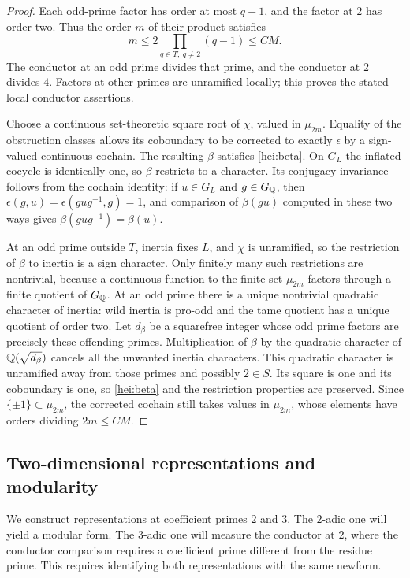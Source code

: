 \begin{proof}
Each odd-prime factor has order at most $q-1$, and the factor at $2$
has order two.  Thus the order $m$ of their product satisfies
\[
              m\le 2\prod_{q\in T,\ q\ne2}(q-1)\le C M.
\]
The conductor at an odd prime divides that prime, and the conductor
at $2$ divides $4$.  Factors at other primes are unramified locally;
this proves the stated local conductor assertions.

Choose a continuous set-theoretic square root of $\chi$, valued in
$\mu_{2m}$.  Equality of the obstruction classes allows its
coboundary to be corrected to exactly $\epsilon$ by a sign-valued
continuous cochain.  The resulting $\beta$ satisfies
\eqref{hei:beta}.  On $G_L$ the inflated cocycle is identically one,
so $\beta$ restricts to a character.  Its conjugacy invariance follows
from the cochain identity: if $u\in G_L$ and $g\in G_\mathbb Q$, then
$\epsilon(g,u)=\epsilon(gug^{-1},g)=1$, and comparison of
$\beta(gu)$ computed in these two ways gives
$\beta(gug^{-1})=\beta(u)$.

At an odd prime outside $T$, inertia fixes $L$, and $\chi$ is
unramified, so the restriction of $\beta$ to inertia is a sign
character.  Only finitely many such restrictions are nontrivial,
because a continuous function to the finite set $\mu_{2m}$ factors
through a finite quotient of $G_\mathbb Q$.  At an odd prime there is a
unique nontrivial quadratic character of inertia: wild inertia is
pro-odd and the tame quotient has a unique quotient of order two.
Let $d_\beta$ be a squarefree integer whose odd prime factors are
precisely these offending primes.  Multiplication of $\beta$ by the
quadratic character of $\mathbb Q(\sqrt{d_\beta})$ cancels all the unwanted
inertia characters.  This quadratic character is unramified away
from those primes and possibly $2\in S$.  Its square is one and its
coboundary is one, so \eqref{hei:beta} and the restriction properties
are preserved.  Since $\{\pm1\}\subset\mu_{2m}$, the corrected cochain
still takes values in $\mu_{2m}$, whose elements have orders dividing
$2m\le CM$.
\end{proof}

\subsection{Two-dimensional representations and modularity}
\label{hei:modularity}

We construct representations at coefficient primes $2$ and $3$.
The $2$-adic one will yield a modular form.  The $3$-adic one will
measure the conductor at $2$, where the conductor comparison requires
a coefficient prime different from the residue prime.  This requires
identifying both representations with the same newform.

